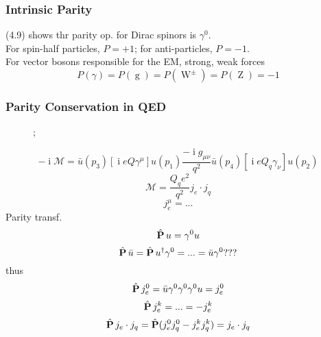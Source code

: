 \documentclass[a4paper]{article}
\DeclareMathOperator{\I}{\mathrm{i}}
\DeclareMathOperator{\hP}{\hat{\vb{P}}}          %
\DeclareMathOperator{\g}{\mathrm{g}}
\DeclareMathOperator{\W}{\mathrm{W}}
\DeclareMathOperator{\Z}{\mathrm{Z}}
\newcommand{\pa}{particle}
\numberwithin{equation}{section}
\begin{document}
\subsubsection{Intrinsic Parity}
(4.9) shows thr parity op. for Dirac spinors is $ \gamma^0 $.\\
For spin-half particles, $ P = +1 $; for anti-particles, $ P = -1 $.\\
For vector bosons responsible for the EM, strong, weak forces
\begin{equation}\label{key}
P(\gamma) = P(\g) = P(\W^\pm) = P(\Z) = -1
\end{equation}

\subsubsection{Parity Conservation in QED}
\begin{figure}[H]
	\centering
	\feynmandiagram [vertical = b to e]{
		a [\pa=$ e^- $] -- [fermion] b -- [fermion] c [\pa=$ e^- $],
		b -- [photon] e,
		d [\pa=q] -- [fermion] e -- [fermion] f [\pa=q],
	};
\end{figure}
\begin{equation}\label{key}
-\I \mathcal{M} = \bar{u}(p_3)[\I e Q \gamma^\mu] u(p_1)\dfrac{-\I g_{\mu\nu}}{q^2} \bar{u}(p_4)[\I e Q_q \gamma_\nu] u(p_2)
\end{equation}
\begin{equation}\label{key}
\mathcal{M} = \dfrac{Q_q e^2}{q^2} j_e \cdot j_q
\end{equation}
\begin{equation}\label{key}
j_e^\mu = ...
\end{equation}
Parity transf.
\begin{equation}\label{key}
\hP u = \gamma^0 u
\end{equation}
\begin{equation}\label{key}
\hP \bar{u} = \hP u^\dagger \gamma^0 = ... = \bar{u}\gamma^0  \text{???}
\end{equation}
thus
\begin{equation}\label{key}
\hP j_e^0 = \bar{u}\gamma^0\gamma^0\gamma^0 u = j_e^0
\end{equation}
\begin{equation}\label{key}
\hP j_e^k = ... = -j_e^k
\end{equation}
\begin{equation}\label{key}
\hP j_e\cdot j_q = \hP(j_e^0 j_q^0 - j_e^k j_q^k) = j_e \cdot j_q
\end{equation}
\end{document}
